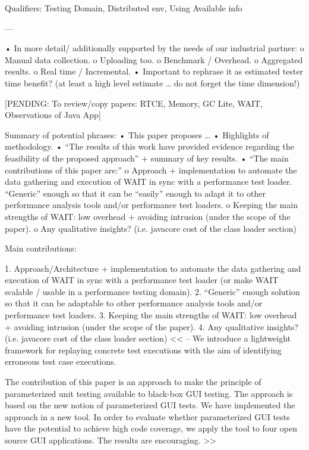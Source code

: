 \documentclass[runningheads,a4paper]{llncs}
\begin{document}
Qualifiers: Testing Domain, Distributed env, Using Available info

---

•	In more detail/ additionally supported by the needs of our industrial partner:
o	Manual data collection.
o	Uploading too.
o	Benchmark / Overhead.
o	Aggregated results.
o	Real time / Incremental.
•	Important to rephrase it as estimated tester time benefit? (at least a high level estimate … do not forget the time dimension!)

[PENDING: To review/copy papers: RTCE, Memory, GC Lite, WAIT, Observations of
Java App]


Summary of potential phrases:
•	This paper proposes …
•	Highlights of methodology.
•	“The results of this work have provided evidence regarding the feasibility of the proposed approach” + summary of key results.
•	“The main contributions of this paper are:”
o	Approach + implementation to automate the data gathering and execution of WAIT in sync with a performance test loader. “Generic” enough so that it can be “easily” enough to adapt it to other performance analysis tools and/or performance test loaders.
o	Keeping the main strengths of WAIT: low overhead + avoiding intrusion (under the scope of the paper).
o	Any qualitative insights? (i.e. javacore cost of the class loader section)

Main contributions:

1. Approach/Architecture + implementation to automate the data gathering and execution of WAIT in sync with a performance test loader (or make WAIT scalable / usable in a performance testing domain).
2. “Generic” enough solution so that it can be adaptable to other performance analysis tools and/or performance test loaders.
3. Keeping the main strengths of WAIT: low overhead + avoiding intrusion (under the scope of the paper).
4. Any qualitative insights? (i.e. javacore cost of the class loader section)
<<
– We introduce a lightweight framework for replaying concrete test executions
with the aim of identifying erroneous test case executions.

The contribution of this paper is an
approach to make the principle of parameterized unit testing available
to black-box GUI testing. The approach is based on the new notion of
parameterized GUI tests. We have implemented the approach in a new
tool. In order to evaluate whether parameterized GUI tests have the potential
to achieve high code coverage, we apply the tool to four open
source GUI applications. The results are encouraging.
>>
\end{document}
